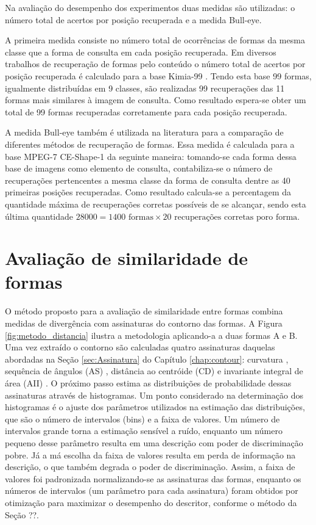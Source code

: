 Na avaliação do desempenho dos experimentos duas medidas são utilizadas: o número total de acertos por posição recuperada e a medida Bull-eye.

A primeira medida consiste no número total de ocorrências de formas da mesma classe que a forma de consulta em cada posição recuperada.  Em diversos trabalhos de recuperação de formas pelo conteúdo o número total de acertos por posição recuperada é calculado para a base Kimia-99 \cite{Bernier:2003}. Tendo esta base 99 formas, igualmente distribuídas em 9 classes, são realizadas 99 recuperações das 11 formas mais similares à imagem de consulta. Como resultado espera-se obter um total de 99 formas recuperadas corretamente para cada posição recuperada.

A medida Bull-eye também é utilizada na literatura para a comparação de diferentes métodos de recuperação de formas. Essa medida é calculada para a base MPEG-7 CE-Shape-1 da seguinte maneira: tomando-se cada forma dessa base de imagens como elemento de consulta, contabiliza-se o número de recuperações pertencentes a mesma classe da forma de consulta dentre as 40 primeiras posições recuperadas. Como resultado calcula-se a percentagem da quantidade máxima de recuperações corretas possíveis de se alcançar, sendo esta última quantidade $28000 = 1400\text{ formas} \times 20\text{ recuperações corretas poro forma}$. 


\section{Avaliação de similaridade de formas}
 \label{Sec:method}
 
O método proposto para a avaliação de similaridade entre formas combina medidas de divergência com assinaturas do contorno das formas. A Figura \ref{fig:metodo_distancia} ilustra a metodologia aplicando-a a duas formas A e B. Uma vez extraído o contorno são calculadas quatro assinaturas daquelas abordadas na Seção \ref{sec:Assinatura} do Capítulo \ref{chap:contour}: curvatura \cite{149591,Costa:2009}, sequência de ângulos (AS) \cite{Fotopoulou:2013}, distância ao centróide (CD) \cite{Costa:2009} e invariante integral de área (AII) \cite{Manay:2006}. O próximo passo estima as distribuições de probabilidade dessas assinaturas através de histogramas. Um ponto considerado na determinação dos histogramas é o ajuste dos parâmetros utilizados na estimação das distribuições, que são o número de intervalos (bins) e a faixa de valores. Um número de intervalos grande torna a estimação sensível a ruído, enquanto um número pequeno desse parâmetro resulta em uma descrição com poder de discriminação pobre. Já a má escolha da faixa de valores resulta em perda de informação na descrição, o que também degrada o poder de discriminação.  Assim, a faixa de valores foi padronizada normalizando-se as assinaturas das formas, enquanto os números de intervalos (um parâmetro para cada assinatura) foram obtidos por otimização para maximizar o desempenho do descritor, conforme o método da Seção ??. 

